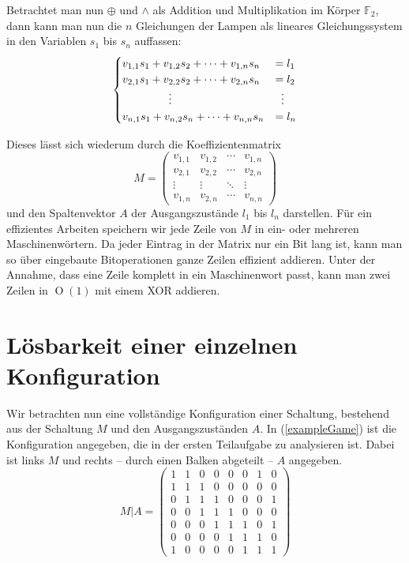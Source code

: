 \documentclass{scrartcl}
\newcommand{\ftwo}{\ensuremath{\mathbb F_2}}
\DeclareMathOperator{\bigO}{O}
\newcommand{\xor}{\oplus}
\begin{document}
Betrachtet man nun $\xor$ und $\land$ als Addition und Multiplikation im Körper
\ftwo, dann kann man nun die $n$ Gleichungen der Lampen als lineares
Gleichungssystem in den Variablen $s_1$ bis $s_n$ auffassen:
\begin{equation}
\begin{cases}
  v_{1,1}s_1+v_{1,2}s_2+\dots+v_{1,n}s_n&=l_1\\
  v_{2,1}s_1+v_{2,2}s_2+\dots+v_{2,n}s_n&=l_2\\
  \hfil\vdots\hfil&\hfil\vdots\hfil\\
  v_{n,1}s_1+v_{n,2}s_n+\dots+v_{n,n}s_n&=l_n\\
\end{cases}
\end{equation}

Dieses lässt sich wiederum durch die Koeffizientenmatrix
\begin{equation}
M=
\begin{pmatrix}
  v_{1,1}&v_{1,2}&\cdots&v_{1,n}\\
  v_{2,1}&v_{2,2}&\cdots&v_{2,n}\\
  \vdots &\vdots &\ddots&\vdots\\
  v_{1,n}&v_{2,n}&\cdots&v_{n,n}
\end{pmatrix}
\end{equation}
und den Spaltenvektor $A$ der Ausgangszustände $l_1$ bis $l_n$ darstellen. Für
ein effizientes Arbeiten speichern wir jede Zeile von $M$ in ein- oder mehreren
Maschinenwörtern. Da jeder Eintrag in der Matrix nur ein Bit lang ist, kann man
so über eingebaute Bitoperationen ganze Zeilen effizient addieren. Unter der
Annahme, dass eine Zeile komplett in ein Maschinenwort passt, kann man zwei
Zeilen in $\bigO(1)$ mit einem XOR addieren.

\section{Lösbarkeit einer einzelnen Konfiguration}
\label{singleConf}
Wir betrachten nun eine vollständige Konfiguration einer Schaltung, bestehend
aus der Schaltung $M$ und den Ausgangszuständen $A$. In (\ref{exampleGame}) ist
die Konfiguration angegeben, die in der ersten Teilaufgabe zu analysieren ist.
Dabei ist links $M$ und rechts -- durch einen Balken abgeteilt -- $A$ angegeben.
\begin{equation}
M\vert A=\left(
\begin{array}{ccccccc|c}
  1&1&0&0&0&0&1&0\\
  1&1&1&0&0&0&0&0\\
  0&1&1&1&0&0&0&1\\
  0&0&1&1&1&0&0&0\\
  0&0&0&1&1&1&0&1\\
  0&0&0&0&1&1&1&0\\
  1&0&0&0&0&1&1&1 
\end{array}\right)\label{exampleGame}
\end{equation}
\end{document}
